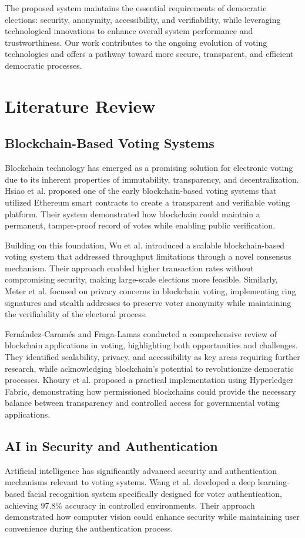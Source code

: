\documentclass[conference]{IEEEtran}
\begin{document}
The proposed system maintains the essential requirements of democratic elections: security, anonymity, accessibility, and verifiability, while leveraging technological innovations to enhance overall system performance and trustworthiness. Our work contributes to the ongoing evolution of voting technologies and offers a pathway toward more secure, transparent, and efficient democratic processes.

\section{Literature Review}
\subsection{Blockchain-Based Voting Systems}
Blockchain technology has emerged as a promising solution for electronic voting due to its inherent properties of immutability, transparency, and decentralization. Hsiao et al. \cite{b6} proposed one of the early blockchain-based voting systems that utilized Ethereum smart contracts to create a transparent and verifiable voting platform. Their system demonstrated how blockchain could maintain a permanent, tamper-proof record of votes while enabling public verification.

Building on this foundation, Wu et al. \cite{b7} introduced a scalable blockchain-based voting system that addressed throughput limitations through a novel consensus mechanism. Their approach enabled higher transaction rates without compromising security, making large-scale elections more feasible. Similarly, Meter et al. \cite{b8} focused on privacy concerns in blockchain voting, implementing ring signatures and stealth addresses to preserve voter anonymity while maintaining the verifiability of the electoral process.

Fernández-Caramés and Fraga-Lamas \cite{b9} conducted a comprehensive review of blockchain applications in voting, highlighting both opportunities and challenges. They identified scalability, privacy, and accessibility as key areas requiring further research, while acknowledging blockchain's potential to revolutionize democratic processes. Khoury et al. \cite{b10} proposed a practical implementation using Hyperledger Fabric, demonstrating how permissioned blockchains could provide the necessary balance between transparency and controlled access for governmental voting applications.

\subsection{AI in Security and Authentication}
Artificial intelligence has significantly advanced security and authentication mechanisms relevant to voting systems. Wang et al. \cite{b11} developed a deep learning-based facial recognition system specifically designed for voter authentication, achieving 97.8\% accuracy in controlled environments. Their approach demonstrated how computer vision could enhance security while maintaining user convenience during the authentication process.
\end{document}
